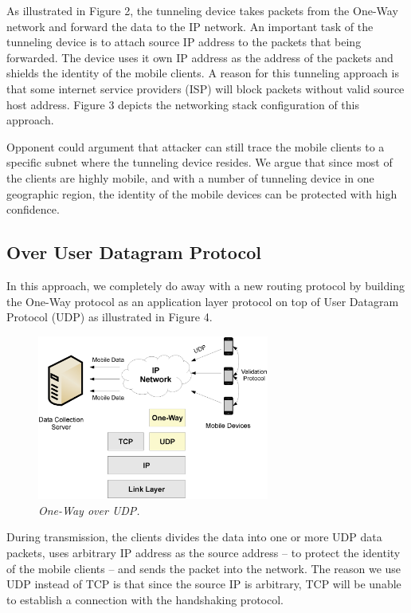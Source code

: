 As illustrated in Figure 2, the tunneling device takes packets from the One-Way
network and forward the
data to the IP network. An important task of the tunneling device is to attach
source IP address to the packets that being forwarded. The device uses it own
IP address as the address of the packets and shields the identity of the mobile
clients. A reason for this tunneling approach is that some internet service
providers (ISP) will block packets without valid source host address. Figure 3
depicts the networking stack configuration of this approach.

Opponent could argument that attacker can still trace the mobile clients to a
specific subnet where the tunneling device resides. We argue that since most of
the clients are highly mobile, and with a number of tunneling device in one
geographic region, the identity of the mobile devices can be protected with high
confidence.

\subsection{Over User Datagram Protocol}
In this approach, we completely do away with a new routing protocol by building
the One-Way protocol as an application layer protocol on top of User Datagram
Protocol (UDP) as illustrated in Figure 4.

\begin{figure}[h]
\begin{center}
\includegraphics[width=3in]{figure4.eps}
\caption{\small \sl One-Way over UDP.\label{fig:Stupendous}}
\end{center}
\end{figure}

During transmission, the clients divides the data into one or more UDP data packets,
uses arbitrary IP address as the source address -- to protect the identity of the
mobile clients -- and sends the packet into the network.
The reason we use UDP instead of TCP is that since the source IP is arbitrary, TCP
will be unable to establish a connection with the handshaking protocol.

